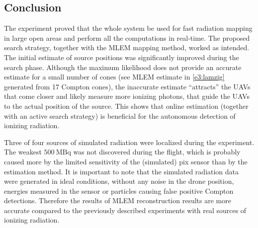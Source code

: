 \subsection{Conclusion}
The experiment proved that the whole system be used for fast radiation mapping in large open areas and perform all the computations in real-time.
The proposed search strategy, together with the \ac{MLEM} mapping method, worked as intended.
The initial estimate of source positions was significantly improved during the search phase.
Although the maximum likelihood does not provide an accurate estimate for a small number of cones (see \ac{MLEM} estimate in \autoref{e3:lamzig} generated from 17 Compton cones), the inaccurate estimate ``attracts'' the \ac{UAV}s that come closer and likely measure more ionizing photons, that guide the \ac{UAV}s to the actual position of the source.
This shows that online estimation (together with an active search strategy) is beneficial for the autonomous detection of ionizing radiation.

Three of four sources of simulated radiation were localized during the experiment.
The weakest $\SI{500}{\mega\becquerel}$ was not discovered during the flight, which is probably caused more by the limited sensitivity of the (simulated) \ac{pix} sensor than by the estimation method. It is important to note that the simulated radiation data were generated in ideal conditions, without any noise in the drone position, energies measured in the sensor or particles causing false positive Compton detections.
Therefore the results of \ac{MLEM} reconstruction results are more accurate compared to the previously described experiments with real sources of ionizing radiation.



